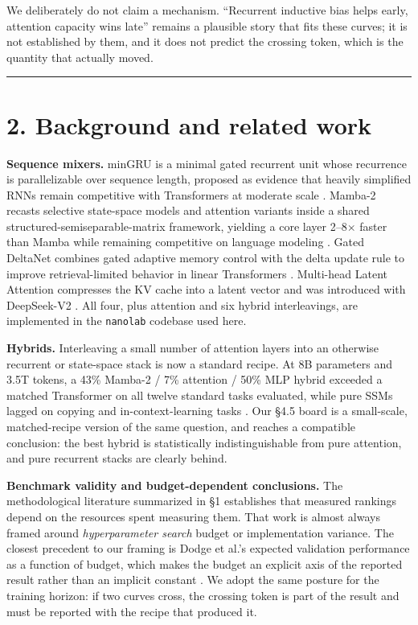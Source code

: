 We deliberately do not claim a mechanism. ``Recurrent inductive bias helps early, attention
capacity wins late'' remains a plausible story that fits these curves; it is not established by
them, and it does not predict the crossing token, which is the quantity that actually moved.

\begin{center}\rule{0.5\linewidth}{0.5pt}\end{center}

\section{2. Background and related work}\label{background-and-related-work}

\textbf{Sequence mixers.} minGRU is a minimal gated recurrent unit whose recurrence is
parallelizable over sequence length, proposed as evidence that heavily simplified RNNs remain
competitive with Transformers at moderate scale \cite{ref1}. Mamba-2 recasts selective state-space models
and attention variants inside a shared structured-semiseparable-matrix framework, yielding a
core layer 2--8$\times$ faster than Mamba while remaining competitive on language modeling \cite{ref2}. Gated
DeltaNet combines gated adaptive memory control with the delta update rule to improve
retrieval-limited behavior in linear Transformers \cite{ref3}. Multi-head Latent Attention compresses the
KV cache into a latent vector and was introduced with DeepSeek-V2 \cite{ref4}. All four, plus attention
and six hybrid interleavings, are implemented in the \texttt{nanolab} codebase used here.

\textbf{Hybrids.} Interleaving a small number of attention layers into an otherwise recurrent or
state-space stack is now a standard recipe. At 8B parameters and 3.5T tokens, a 43\% Mamba-2 / 7\%
attention / 50\% MLP hybrid exceeded a matched Transformer on all twelve standard tasks evaluated,
while pure SSMs lagged on copying and in-context-learning tasks \cite{ref5}. Our \S4.5 board is a
small-scale, matched-recipe version of the same question, and reaches a compatible conclusion:
the best hybrid is statistically indistinguishable from pure attention, and pure recurrent stacks
are clearly behind.

\textbf{Benchmark validity and budget-dependent conclusions.} The methodological literature
summarized in \S1 \cite{ref6,ref7,ref8,ref38} establishes that measured rankings depend on the resources spent
measuring them. That work is almost always framed around \emph{hyperparameter search} budget or
implementation variance. The closest precedent to our framing is Dodge et al.'s expected
validation performance as a function of budget, which makes the budget an explicit axis of the
reported result rather than an implicit constant \cite{ref7}. We adopt the same posture for the training
horizon: if two curves cross, the crossing token is part of the result and must be reported with
the recipe that produced it.

